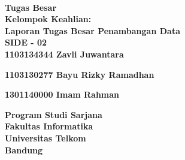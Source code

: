 {\centering
\large
{\bigsize\bf \Title}\\
\vspace{ 2cm}
\rm
\iflogTA
\textbf{Tugas Besar}\\
\vspace{0.5 cm}
\textbf{Kelompok Keahlian: \KK}\\
\else
\textbf{Laporan Tugas Besar Penambangan Data}\\
\vspace{0.5 cm}
\textbf{SIDE - 02}\\
\fi
\vspace{0.5 cm}
\textbf{1103134344      Zavli Juwantara}


\textbf{1103130277      Bayu Rizky Ramadhan}


\textbf{1301140000      Imam Rahman}
\vspace{1.5 cm}

\begin{figure}[h]
{\par}
\end{figure}

\vspace{2 cm}
{\bigsize\textbf{Program Studi Sarjana \Prodi}\\
\vspace{0.5 cm}
\textbf{Fakultas Informatika}\\
\vspace{0.5 cm}
\textbf{Universitas Telkom}\\
\vspace{0.5 cm}
\textbf{Bandung}\\
\vspace{0.5 cm}
\textbf{\Date}\\}
}
